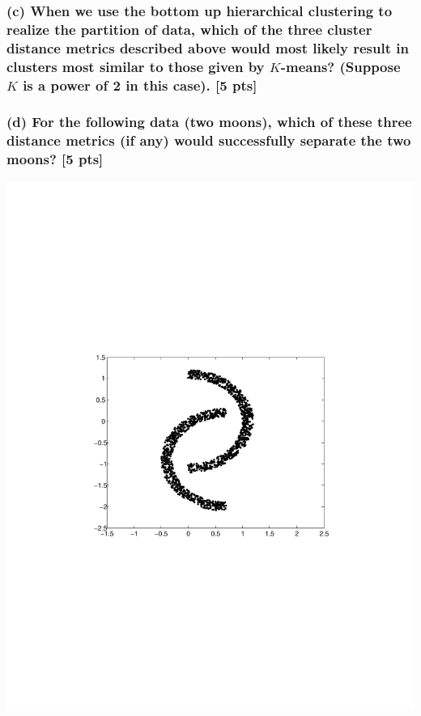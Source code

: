 \documentclass[twoside,10pt]{article}
\begin{document}
\subsubsection*{(c) When we use the bottom up hierarchical clustering to realize the partition of data, which of the three cluster distance metrics described above would most likely result in clusters most similar to those given by $K$-means? (Suppose $K$ is a power of 2 in this case). [5 pts]}

\subsubsection*{(d) For the following data (two moons), which of these three distance metrics (if any) would successfully separate the two moons? [5 pts]}

\includegraphics[trim = 0mm 90mm 0mm 90mm, clip, width = \linewidth]{clustering}

\vspace{1cm}
\end{document}
